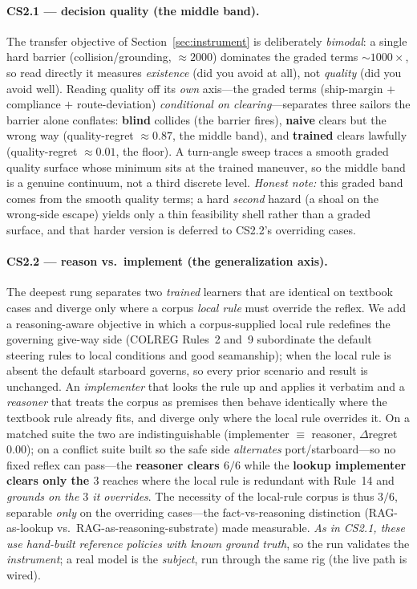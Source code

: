 \documentclass{article}
\begin{document}
\paragraph{CS2.1 --- decision quality (the middle band).} The transfer objective of
Section~\ref{sec:instrument} is deliberately \emph{bimodal}: a single hard barrier (collision/grounding,
$\approx 2000$) dominates the graded terms $\sim\!1000\times$, so read directly it measures
\emph{existence} (did you avoid at all), not \emph{quality} (did you avoid well). Reading quality off
its \emph{own} axis---the graded terms (ship-margin $+$ compliance $+$ route-deviation) \emph{conditional
on clearing}---separates three sailors the barrier alone conflates: \textbf{blind} collides (the barrier
fires), \textbf{naive} clears but the wrong way (quality-regret $\approx 0.87$, the middle band), and
\textbf{trained} clears lawfully (quality-regret $\approx 0.01$, the floor). A turn-angle sweep traces a
smooth graded quality surface whose minimum sits at the trained maneuver, so the middle band is a genuine
continuum, not a third discrete level. \emph{Honest note:} this graded band comes from the smooth quality
terms; a hard \emph{second} hazard (a shoal on the wrong-side escape) yields only a thin feasibility shell
rather than a graded surface, and that harder version is deferred to CS2.2's overriding cases.

\paragraph{CS2.2 --- reason vs.\ implement (the generalization axis).} The deepest rung separates two
\emph{trained} learners that are identical on textbook cases and diverge only where a corpus \emph{local
rule} must override the reflex. We add a reasoning-aware objective in which a corpus-supplied local rule
redefines the governing give-way side (COLREG Rules~2 and~9 subordinate the default steering rules to
local conditions and good seamanship); when the local rule is absent the default starboard governs, so
every prior scenario and result is unchanged. An \emph{implementer} that looks the rule up and applies it
verbatim and a \emph{reasoner} that treats the corpus as premises then behave identically where the
textbook rule already fits, and diverge only where the local rule overrides it. On a matched suite the two
are indistinguishable (implementer $\equiv$ reasoner, $\Delta$regret $0.00$); on a conflict suite built so
the safe side \emph{alternates} port/starboard---so no fixed reflex can pass---the \textbf{reasoner clears
$6/6$} while the \textbf{lookup implementer clears only the $3$} reaches where the local rule is redundant
with Rule~14 and \emph{grounds on the $3$ it overrides}. The necessity of the local-rule corpus is thus
$3/6$, separable \emph{only} on the overriding cases---the fact-vs-reasoning distinction (RAG-as-lookup
vs.\ RAG-as-reasoning-substrate) made measurable. \emph{As in CS2.1, these use hand-built reference
policies with known ground truth}, so the run validates the \emph{instrument}; a real model is the
\emph{subject}, run through the same rig (the live path is wired).
\end{document}
